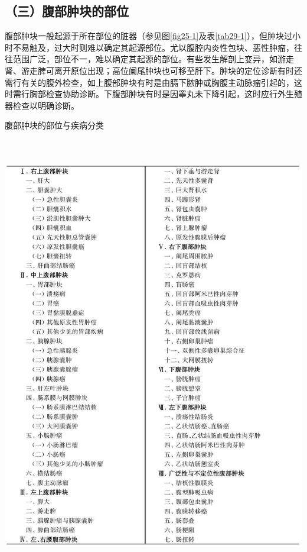 \subsection{（三）腹部肿块的部位}

腹部肿块一般起源于所在部位的脏器（参见图\ref{fig25-1}及表\ref{tab29-1}），但肿块过小时不易触及，过大时则难以确定其起源部位。尤以腹腔内炎性包块、恶性肿瘤，往往范围广泛，部位不一，难以确定其起源的部位。有些发生解剖上变异，如游走肾、游走脾可离开原位出现；高位阑尾肿块也可移至肝下。肿块的定位诊断有时还需行有关的腹外检查，如上腹部肿块有时是由膈下脓肿或胸腹主动脉瘤引起的，这时需行胸部检查协助诊断。下腹部肿块有时是因睾丸未下降引起，这时应行外生殖器检查以明确诊断。

\begin{table}[htbp]
\centering
\caption{腹部肿块的部位与疾病分类}
\label{tab29-1}
\includegraphics[width=5.91667in,height=7.61458in]{./images/Image00154.jpg}
\end{table}

